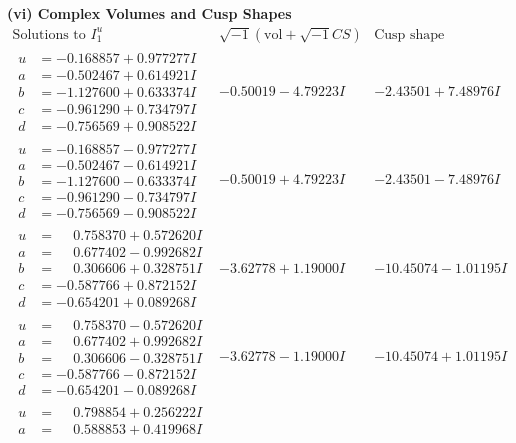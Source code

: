 \documentclass[1p]{elsarticle_modified}
\theoremstyle{definition}
\newcommand{\I}{\sqrt{-1}}
\begin{document}
\newpage\flushleft \textbf{(vi) Complex Volumes and Cusp Shapes}
$$\begin{array}{c|c|c}  
\text{Solutions to }I^u_{1}& \I (\text{vol} + \sqrt{-1}CS) & \text{Cusp shape}\\
 \hline 
\begin{aligned}
u &= -0.168857 + 0.977277 I \\
a &= -0.502467 + 0.614921 I \\
b &= -1.127600 + 0.633374 I \\
c &= -0.961290 + 0.734797 I \\
d &= -0.756569 + 0.908522 I\end{aligned}
 & -0.50019 - 4.79223 I & -2.43501 + 7.48976 I \\ \hline\begin{aligned}
u &= -0.168857 - 0.977277 I \\
a &= -0.502467 - 0.614921 I \\
b &= -1.127600 - 0.633374 I \\
c &= -0.961290 - 0.734797 I \\
d &= -0.756569 - 0.908522 I\end{aligned}
 & -0.50019 + 4.79223 I & -2.43501 - 7.48976 I \\ \hline\begin{aligned}
u &= \phantom{-}0.758370 + 0.572620 I \\
a &= \phantom{-}0.677402 - 0.992682 I \\
b &= \phantom{-}0.306606 + 0.328751 I \\
c &= -0.587766 + 0.872152 I \\
d &= -0.654201 + 0.089268 I\end{aligned}
 & -3.62778 + 1.19000 I & -10.45074 - 1.01195 I \\ \hline\begin{aligned}
u &= \phantom{-}0.758370 - 0.572620 I \\
a &= \phantom{-}0.677402 + 0.992682 I \\
b &= \phantom{-}0.306606 - 0.328751 I \\
c &= -0.587766 - 0.872152 I \\
d &= -0.654201 - 0.089268 I\end{aligned}
 & -3.62778 - 1.19000 I & -10.45074 + 1.01195 I \\ \hline\begin{aligned}
u &= \phantom{-}0.798854 + 0.256222 I \\
a &= \phantom{-}0.588853 + 0.419968 I \\

\end{aligned}
\end{array}$$
\end{document}

